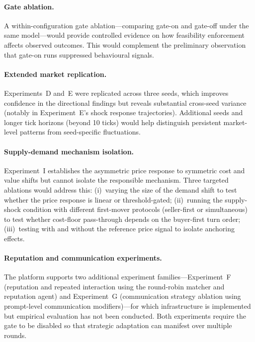 \paragraph{Gate ablation.}
A within-configuration gate ablation---comparing gate-on and gate-off under the same model---would provide controlled evidence on how feasibility enforcement affects observed outcomes.  This would complement the preliminary observation that gate-on runs suppressed behavioural signals.

\paragraph{Extended market replication.}
Experiments~D and~E were replicated across three seeds, which improves confidence in the directional findings but reveals substantial cross-seed variance (notably in Experiment~E's shock response trajectories).  Additional seeds and longer tick horizons (beyond 10 ticks) would help distinguish persistent market-level patterns from seed-specific fluctuations.

\paragraph{Supply-demand mechanism isolation.}
Experiment~I establishes the asymmetric price response to symmetric cost and value shifts but cannot isolate the responsible mechanism.  Three targeted ablations would address this: (i)~varying the size of the demand shift to test whether the price response is linear or threshold-gated; (ii)~running the supply-shock condition with different first-mover protocols (seller-first or simultaneous) to test whether cost-floor pass-through depends on the buyer-first turn order; (iii)~testing with and without the reference price signal to isolate anchoring effects.

\paragraph{Reputation and communication experiments.}
The platform supports two additional experiment families---Experiment~F (reputation and repeated interaction using the round-robin matcher and reputation agent) and Experiment~G (communication strategy ablation using prompt-level communication modifiers)---for which infrastructure is implemented but empirical evaluation has not been conducted.  Both experiments require the gate to be disabled so that strategic adaptation can manifest over multiple rounds.

